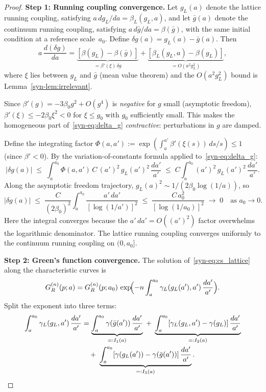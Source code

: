 \documentclass[11pt]{article}
\theoremstyle{definition}
\begin{document}
\begin{proof}
\textbf{Step 1: Running coupling convergence.}
Let $g_L(a)$ denote the lattice running coupling,
satisfying $a\,dg_L/da = \beta_L(g_L, a)$, and let
$\bar{g}(a)$ denote the continuum running coupling,
satisfying $a\,d\bar{g}/da = \beta(\bar{g})$, with the
same initial condition at a reference scale~$a_0$.
Define $\delta g(a) = g_L(a) - \bar{g}(a)$.  Then
\begin{equation}\label{syn-eq:delta_g}
  a\,\frac{d(\delta g)}{da}
  = \underbrace{[\beta(g_L) - \beta(\bar{g})]}_{
  = \beta'(\xi)\,\delta g}
  + \underbrace{[\beta_L(g_L, a) - \beta(g_L)]}_{
  = O(a^2 g_L^2)},
\end{equation}
where $\xi$ lies between $g_L$ and $\bar{g}$
(mean value theorem) and the $O(a^2 g_L^2)$ bound
is Lemma~\ref{syn-lem:irrelevant}.

Since $\beta'(g) = -3\beta_0 g^2 + O(g^4)$
is \emph{negative} for $g$ small (asymptotic freedom),
$\beta'(\xi) \leq -2\beta_0 \xi^2 < 0$ for
$\xi \leq g_0$ with $g_0$ sufficiently small.
This makes the homogeneous part of~\eqref{syn-eq:delta_g}
\emph{contractive}: perturbations in $g$ are damped.

Define the integrating factor
$\Phi(a, a') :=
\exp(\int_a^{a'} \beta'(\xi(s))\,ds/s) \leq 1$
(since $\beta' < 0$).  By the variation-of-constants
formula applied to~\eqref{syn-eq:delta_g}:
\begin{equation}\label{syn-eq:gronwall_bound}
  |\delta g(a)|
  \;\leq\; \int_a^{a_0} \Phi(a, a')\,
  C\,(a')^2\,g_L(a')^2\,\frac{da'}{a'}
  \;\leq\; C \int_a^{a_0}
  (a')^2\,g_L(a')^2\,\frac{da'}{a'}.
\end{equation}
Along the asymptotic freedom trajectory,
$g_L(a)^2 \sim 1/(2\beta_0\log(1/a))$, so
\begin{equation}
  |\delta g(a)|
  \;\leq\; \frac{C}{(2\beta_0)^2}
  \int_a^{a_0}
  \frac{a'\,da'}{[\log(1/a')]^2}
  \;\leq\; \frac{C\,a_0^2}{[\log(1/a_0)]^2}
  \;\to\; 0 \quad \text{as } a_0 \to 0.
\end{equation}
Here the integral converges because the
$a'\,da' = O((a')^2)$ factor overwhelms the
logarithmic denominator.  The lattice running
coupling converges uniformly to the continuum
running coupling on $(0, a_0]$.

\smallskip
\textbf{Step 2: Green's function convergence.}
The solution of~\eqref{syn-eq:cs_lattice} along
the characteristic curves is
\begin{equation}\label{syn-eq:cs_solution}
  G_R^{(n)}(p; a)
  = G_R^{(n)}(p; a_0)\,
  \exp\!\Bigl(-n\int_a^{a_0}
  \gamma_L(g_L(a'), a')\,\frac{da'}{a'}\Bigr).
\end{equation}
Split the exponent into three terms:
\begin{align}
  \int_a^{a_0} \gamma_L(g_L, a')\,\frac{da'}{a'}
  &= \underbrace{\int_a^{a_0}
  \gamma(\bar{g}(a'))\,\frac{da'}{a'}}_{=: I_1(a)}
  \;+\; \underbrace{\int_a^{a_0}
  [\gamma_L(g_L, a') - \gamma(g_L)]\,
  \frac{da'}{a'}}_{=: I_2(a)} \notag \\
  &\quad +\; \underbrace{\int_a^{a_0}
  [\gamma(g_L(a')) - \gamma(\bar{g}(a'))]\,
  \frac{da'}{a'}}_{=: I_3(a)}.
  \label{syn-eq:exponent_split}
\end{align}


\end{proof}
\end{document}
